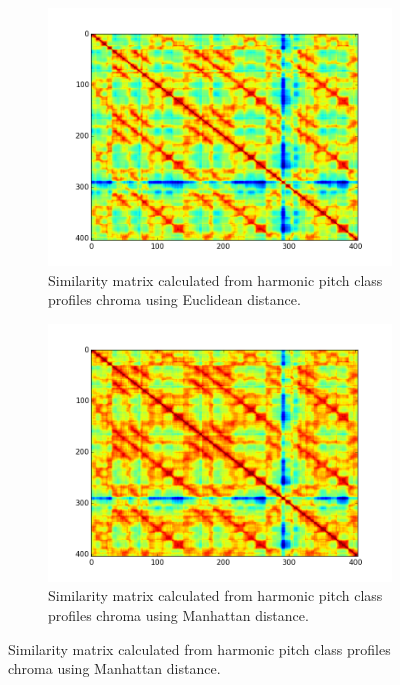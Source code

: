 \begin{figure}[t]
        \centering
        \begin{subfigure}[b]{0.31\textwidth}
                \includegraphics[width=\textwidth]{Figures/ssm_euclidean}
                \caption{Similarity matrix calculated from harmonic pitch class profiles chroma using Euclidean distance.}
                \label{fig:euclidean}
        \end{subfigure}%
        \begin{subfigure}[b]{0.31\textwidth}
                \includegraphics[width=\textwidth]{Figures/ssm_manhattan}
                \caption{Similarity matrix calculated from harmonic pitch class profiles chroma using Manhattan distance.}

\end{subfigure}
\end{figure}
